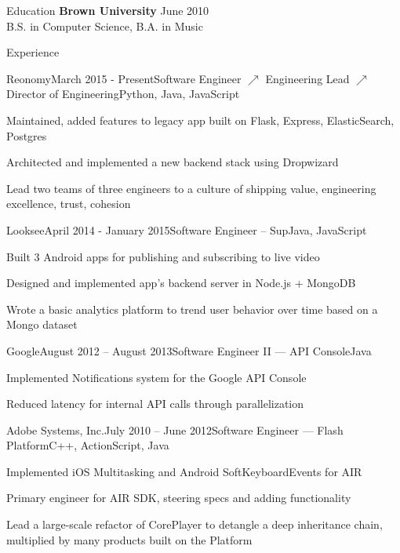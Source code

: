 \documentclass{resume} %
\begin{document}
\begin{rSection}{Education}
{\bf Brown University} \hfill {June 2010} \\ 
B.S. in Computer Science, B.A. in Music
\end{rSection}

\begin{rSection}{Experience}

\begin{rSubsection}{Reonomy}{March 2015 - Present}{Software Engineer $\nearrow$ Engineering Lead $\nearrow$ Director of Engineering}{Python, Java, JavaScript}
\item Maintained, added features to legacy app built on Flask, Express, ElasticSearch, Postgres
\item Architected and implemented a new backend stack using Dropwizard
\item Lead two teams of three engineers to a culture of shipping value, engineering excellence, trust, cohesion
\end{rSubsection}
\begin{rSubsection}{Looksee}{April 2014 - January 2015}{Software Engineer -- Sup}{Java, JavaScript}
\item Built 3 Android apps for publishing and subscribing to live video
\item Designed and implemented app's backend server in Node.js + MongoDB
\item Wrote a basic analytics platform to trend user behavior over time based on a Mongo dataset
\end{rSubsection}
\begin{rSubsection}{Google}{August 2012 -- August 2013}{Software Engineer II --- API Console}{Java}
\item Implemented Notifications system for the Google API Console
\item Reduced latency for internal API calls through parallelization
\end{rSubsection}
\begin{rSubsection}{Adobe Systems, Inc.}{July 2010 -- June 2012}{Software Engineer --- Flash Platform}{C++, ActionScript, Java}
\item Implemented iOS Multitasking and Android SoftKeyboardEvents for AIR
\item Primary engineer for AIR SDK, steering specs and adding functionality
\item Lead a large-scale refactor of CorePlayer to detangle a deep inheritance
    chain, multiplied by many products built on the Platform
\end{rSubsection}
\end{rSection}
\end{document}

